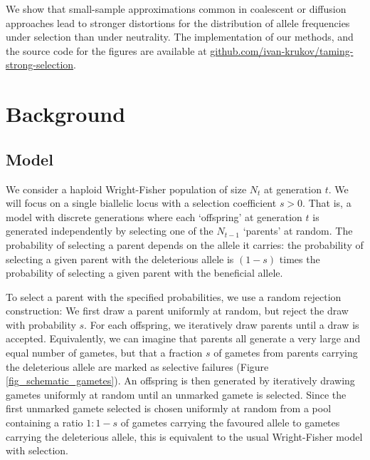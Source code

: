 \documentclass[9pt,twocolumn,twoside,lineno]{gsajnl}
\begin{document}
We show that small-sample approximations common in coalescent or diffusion approaches lead to stronger distortions for the distribution of allele frequencies under selection than under neutrality. 
The implementation of our methods,
and the source code for the figures are available at
\url{github.com/ivan-krukov/taming-strong-selection}.


\section{Background}
\label{sec_background}
\subsection{Model}
We consider a haploid Wright-Fisher population of size $N_t$ at generation $t$. We will focus on a single biallelic locus with a selection coefficient $s>0$. That is, a model with discrete generations where each `offspring' at generation $t$ is generated independently by selecting one of the $N_{t-1}$ `parents' at random.  The probability of selecting a parent depends on the allele it carries: the probability of selecting a given parent with the deleterious allele is $(1-s)$ times the probability of selecting a given parent with the beneficial allele. 

To select a parent with the specified probabilities, we use a random rejection construction: We first draw a parent uniformly at random, but reject the draw with probability $s.$ For each offspring, we iteratively draw parents until a draw is accepted.  
Equivalently, we can imagine that parents all generate a very large and equal number of gametes, but that a fraction $s$ of gametes from parents carrying the deleterious allele are marked as selective failures (Figure \ref{fig_schematic_gametes}). An offspring is then generated by iteratively drawing gametes uniformly at random until an unmarked gamete is selected. Since the first unmarked gamete selected is chosen uniformly at random from a pool containing a ratio $1:1-s$ of gametes carrying the favoured allele to gametes carrying the deleterious allele, this is equivalent to the usual Wright-Fisher model with selection.   
\end{document}
